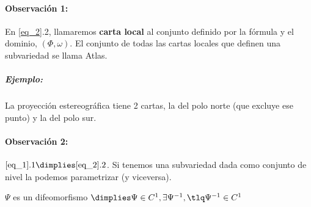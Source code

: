  \paragraph{Observación 1:} En \ref{eq_2}.2, llamaremos \textbf{carta local} al conjunto definido por la fórmula y el dominio, $(\Phi,\omega)$. El conjunto de todas las cartas locales que definen una subvariedad se llama Atlas.
 
 \subparagraph{Ejemplo:} 
 
 La proyección estereográfica tiene 2 cartas, la del polo norte (que excluye ese punto) y la del polo sur.
 
 \paragraph{Observación 2:} $\ref{eq_1}.1 \dimplies \ref{eq_2}.2$. Si tenemos una subvariedad dada como conjunto de nivel la podemos parametrizar (y viceversa).
 
\begin{defn}[Difeomorfismo]
$\Psi$ es un difeomorfismo $\dimplies \Psi\in C^1,\exists \Psi^{-1}, \tlq \Psi^{-1}\in C^1$
\end{defn}
 


